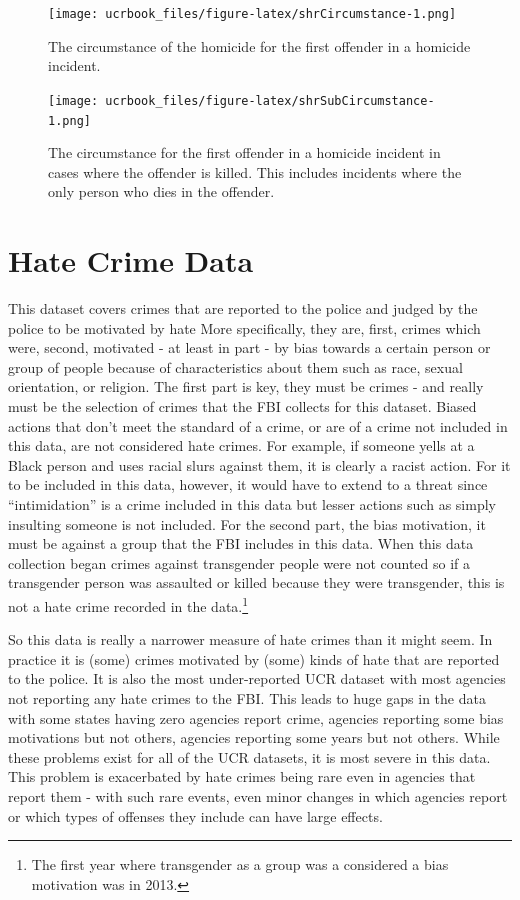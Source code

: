 \documentclass[
  12pt,
  openany]{book}
\begin{document}
\begin{figure}
\centering
\texttt{[image: ucrbook\_files/figure-latex/shrCircumstance-1.png]}
\caption{\label{fig:shrCircumstance}The circumstance of the homicide for the first offender in a homicide incident.}
\end{figure}

\begin{figure}
\centering
\texttt{[image: ucrbook\_files/figure-latex/shrSubCircumstance-1.png]}
\caption{\label{fig:shrSubCircumstance}The circumstance for the first offender in a homicide incident in cases where the offender is killed. This includes incidents where the only person who dies in the offender.}
\end{figure}

\hypertarget{hate_crimes}{%
\chapter{Hate Crime Data}\label{hate_crimes}}

This dataset covers crimes that are reported to the police and judged by the police to be motivated by hate More specifically, they are, first, crimes which were, second, motivated - at least in part - by bias towards a certain person or group of people because of characteristics about them such as race, sexual orientation, or religion. The first part is key, they must be crimes - and really must be the selection of crimes that the FBI collects for this dataset. Biased actions that don't meet the standard of a crime, or are of a crime not included in this data, are not considered hate crimes. For example, if someone yells at a Black person and uses racial slurs against them, it is clearly a racist action. For it to be included in this data, however, it would have to extend to a threat since ``intimidation'' is a crime included in this data but lesser actions such as simply insulting someone is not included. For the second part, the bias motivation, it must be against a group that the FBI includes in this data. When this data collection began crimes against transgender people were not counted so if a transgender person was assaulted or killed because they were transgender, this is not a hate crime recorded in the data.\footnote{The first year where transgender as a group was a considered a bias motivation was in 2013.}

So this data is really a narrower measure of hate crimes than it might seem. In practice it is (some) crimes motivated by (some) kinds of hate that are reported to the police. It is also the most under-reported UCR dataset with most agencies not reporting any hate crimes to the FBI. This leads to huge gaps in the data with some states having zero agencies report crime, agencies reporting some bias motivations but not others, agencies reporting some years but not others. While these problems exist for all of the UCR datasets, it is most severe in this data. This problem is exacerbated by hate crimes being rare even in agencies that report them - with such rare events, even minor changes in which agencies report or which types of offenses they include can have large effects.
\end{document}
